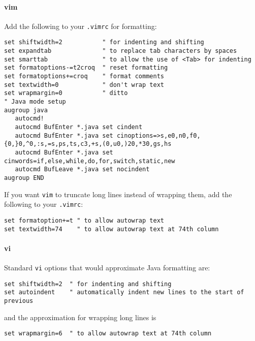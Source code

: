 \paragraph{vim}\label{options:vim}

Add the following to your {\tt .vimrc} for formatting:
\begin{verbatim}
set shiftwidth=2           " for indenting and shifting
set expandtab              " to replace tab characters by spaces
set smarttab               " to allow the use of <Tab> for indenting
set formatoptions-=t2croq  " reset formatting
set formatoptions+=croq    " format comments
set textwidth=0            " don't wrap text
set wrapmargin=0           " ditto
" Java mode setup
augroup java
   autocmd!
   autocmd BufEnter *.java set cindent
   autocmd BufEnter *.java set cinoptions=>s,e0,n0,f0,{0,}0,^0,:s,=s,ps,ts,c3,+s,(0,u0,)20,*30,gs,hs
   autocmd BufEnter *.java set cinwords=if,else,while,do,for,switch,static,new
   autocmd BufLeave *.java set nocindent
augroup END
\end{verbatim}
If you want {\tt vim} to truncate long lines instead of wrapping them, add
the following to your {\tt .vimrc}:
\begin{verbatim}
set formatoption+=t " to allow autowrap text
set textwidth=74    " to allow autowrap text at 74th column
\end{verbatim}

\paragraph{vi}\label{options:vi}

Standard {\tt vi} options that would approximate Java formatting are:
\begin{verbatim}
set shiftwidth=2  " for indenting and shifting
set autoindent    " automatically indent new lines to the start of previous
\end{verbatim}
and the approximation for wrapping long lines is
\begin{verbatim}
set wrapmargin=6  " to allow autowrap text at 74th column
\end{verbatim}


